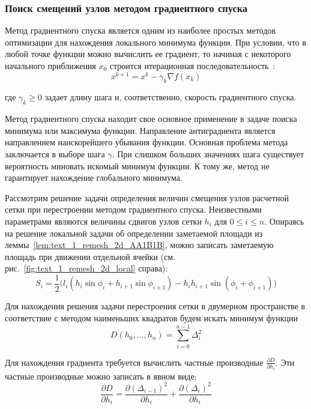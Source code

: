\subsubsection{Поиск смещений узлов методом градиентного спуска}

Метод градиентного спуска\label{term:gradient_spusk} является одним из наиболее простых методов оптимизации для нахождения локального минимума функции.
При условии, что в любой точке функции можно вычислить ее градиент, то начиная с некоторого начального приближения $x_0$ строится итерационная последовательность~\cite{Kantorovich1984Func}:
\begin{equation}
x^{k+1} = x^k - \gamma_k \nabla f(x_k)
\end{equation}

где $\gamma_k \ge 0$ задает длину шага и, соответственно, скорость градиентного спуска.

Метод градиентного спуска находит свое основное применение в задаче поиска минимума или максимума функции.
Направление антиградиента является направлением наискорейшего убывания функции.
Основная проблема метода заключается в выборе шага $\gamma$.
При слишком больших значениях шага существует вероятность миновать искомый минимум функции.
К тому же, метод не гарантирует нахождение глобального минимума.

Рассмотрим решение задачи определения величин смещения узлов расчетной сетки при перестроении методом градиентного спуска.
Неизвестными параметрами являются величины сдвигов узлов сетки $h_i$ для $0 \le i \le n$.
Опираясь на решение локальной задачи об определении заметаемой площади из леммы~\ref{lem:text_1_remesh_2d_AA1B1B}, можно записать заметаемую площадь при движении отдельной ячейки (см. рис.~\ref{fig:text_1_remesh_2d_local} справа):
\begin{equation}
S_i = \frac{1}{2}\big(l_i(h_i \sin \phi_i + h_{i + 1} \sin \phi_{i+1}) - h_ih_{i + 1} \sin(\phi_i + \phi_{i+1})\big) 
\end{equation}

Для нахождения решения задачи перестроения сетки в двумерном пространстве в соответствие с методом наименьших квадратов будем искать минимум функции
\begin{equation}
D(h_0, \dots, h_{n}) = \sum_{i = 0}^{n - 1}{\Delta_i^2}
\end{equation}

Для нахождения градиента требуется вычислить частные производные $\frac{\partial D}{\partial h_i}$.
Эти частные производные можно записать в явном виде:
\begin{equation}
\frac{\partial D}{\partial h_i} = \frac{\partial (\Delta_{i - 1})^2}{\partial h_i} + \frac{\partial (\Delta_i)^2}{\partial h_i}
\end{equation}

